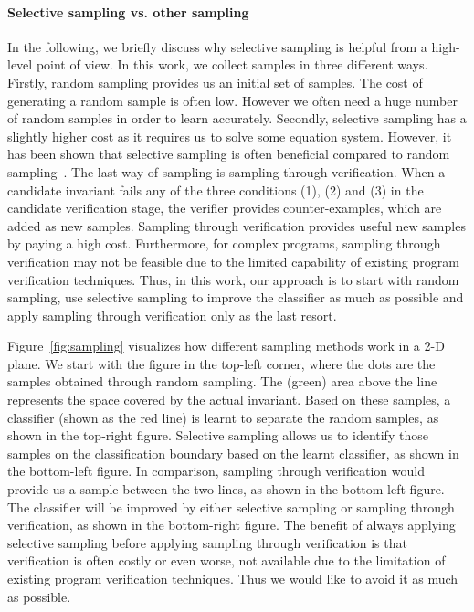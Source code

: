 \paragraph{Selective sampling vs. other sampling} In the following, we briefly discuss why selective sampling is helpful from a high-level point of view. In this work, we collect samples in three different ways. Firstly, random sampling provides us an initial set of samples. The cost of generating a random sample is often low. However we often need a huge number of random samples in order to learn accurately. Secondly, selective sampling has a slightly higher cost as it requires us to solve some equation system. However, it has been shown that selective sampling is often beneficial compared to random sampling~\cite{DBLP:conf/mm/TongC01,DBLP:journals/jmlr/TongK01}. The last way of sampling is sampling through verification. When a candidate invariant fails any of the three conditions (1), (2) and (3) in the candidate verification stage, the verifier provides counter-examples, which are added as new samples. Sampling through verification provides useful new samples by paying a high cost. Furthermore, for complex programs, sampling through verification may not be feasible due to the limited capability of existing program verification techniques. Thus, in this work, our approach is to start with random sampling, use selective sampling to improve the classifier as much as possible and apply sampling through verification only as the last resort.

Figure~\ref{fig:sampling} visualizes how different sampling methods work in a 2-D plane. We start with the figure in the top-left corner, where the dots are the samples obtained through random sampling. The (green) area above the line represents the space covered by the actual invariant. Based on these samples, a classifier (shown as the red line) is learnt to separate the random samples, as shown in the top-right figure. Selective sampling allows us to identify those samples on the classification boundary based on the learnt classifier, as shown in the bottom-left figure. In comparison, sampling through verification would provide us a sample between the two lines, as shown in the bottom-left figure. The classifier will be improved by either selective sampling or sampling through verification, as shown in the bottom-right figure. The benefit of always applying selective sampling before applying sampling through verification is that verification is often costly or even worse, not available due to the limitation of existing program verification techniques. Thus we would like to avoid it as much as possible.

